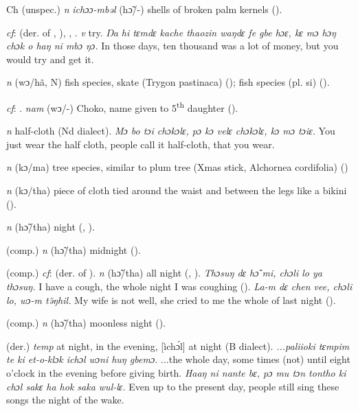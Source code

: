 \begin{letter}{Ch}
 (unspec.) \textit{n} \textit{ichɔɔ-mbəl} (hɔ̃/-) shells of broken palm kernels (\citealt{Pichl1967}). 

 \textit{cf}:  (der. of , ), , . \textit{v} try. \textit{Ŋa hi tɛmdɛ kache thaozin waŋdɛ fe gbe hɔɛ, kɛ mɔ hɔŋ chɔk o haŋ ni mbɔ ŋɔ.} In those days, ten thousand was a lot of money, but you would try and get it.

 \textit{n} (wɔ/hã, N) fish species, skate (Trygon pastinaca) (\citealt{Pichl1967}); fish species (pl. si) (\citealt{Sumner1921}). 

 \textit{cf}: . \textit{nam} (wɔ/-) Choko, name given to 5\textsuperscript{th} daughter (\citealt{Pichl1967}). 

 \textit{n} half-cloth (Nd dialect). \textit{Mɔ bo tɔi chɔkɔlɛ, pɔ kɔ velɛ chɔkɔlɛ, kɔ mɔ tɔiɛ.} You just wear the half cloth, people call it half-cloth, that you wear. 

 \textit{n} (kɔ/ma) tree species, similar to plum tree (Xmas stick, Alchornea cordifolia) (\citealt{Pichl1967})

 \textit{n} (kɔ/tha) piece of cloth tied around the waist and between the legs like a bikini (\citealt{Pichl1967}). 

 \textit{n} (hɔ̃/tha) night (\citealt{Pichl1967}, \citealt{Sumner1921}). 

 (comp.) \textit{n} (hɔ̃/tha) midnight (\citealt{Pichl1967}).

 (comp.) \textit{cf}:  (der. of ). \textit{n} (hɔ̃/tha) all night (\citealt{Pichl1967}, \citealt{Sumner1921}). \textit{Thɔsuŋ dɛ hɔ̃ mi, chɔli lo ya thɔsuŋ.} I have a cough, the whole night I was coughing (\citealt{Pichl1967}). \textit{La-m dɛ chen vee, chɔli lo, wɔ-m tə̃ŋhil.} My wife is not well, she cried to me the whole of last night (\citealt{Pichl1967}). 

 (comp.) \textit{n} (hɔ̃/tha) moonless night (\citealt{Pichl1967}).

 (der.) \textit{temp} at night, in the evening, [ìchɔ́l] at night (B dialect). \textit{...paliioki tɛmpim te ki et-o-klɔk ichɔl wɔni huŋ gbemɔ.} ...the whole day, some times (not) until eight o'clock in the evening before giving birth. \textit{Haaŋ ni nante bɛ, pɔ mu tɔn tontho ki chɔl sakɛ ha hok saka wul-lɛ.} Even up to the present day, people still sing these songs the night of the wake.


\end{letter}
